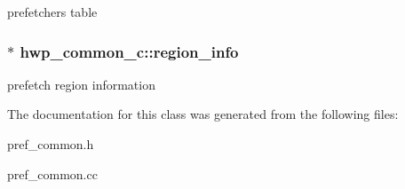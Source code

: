 \label{classhwp__common__c_aaad4b27dd21568522b666a86f953a6f3}
prefetchers table \hypertarget{classhwp__common__c_a0f572e4a38d137dcd255b8f822cd2250}{
\subsubsection[{region\_\-info}]{$\ast$ {\bf hwp\_\-common\_\-c::region\_\-info}}}
\label{classhwp__common__c_a0f572e4a38d137dcd255b8f822cd2250}
prefetch region information 

The documentation for this class was generated from the following files:\begin{DoxyCompactItemize}
\item 
pref\_\-common.h\item 
pref\_\-common.cc\end{DoxyCompactItemize}
